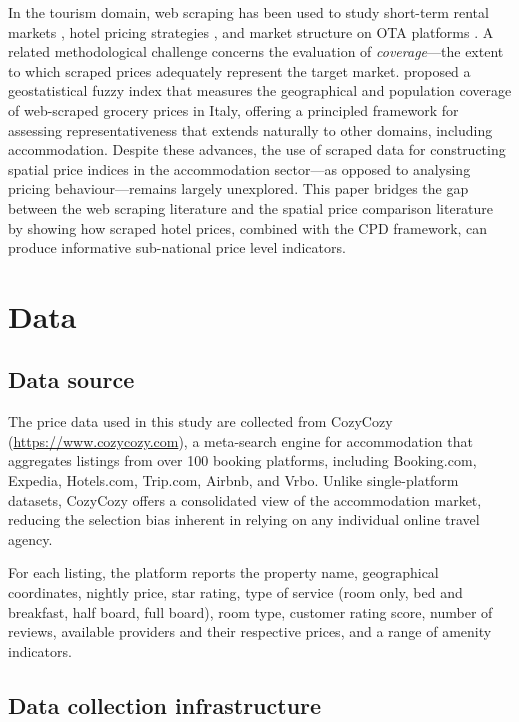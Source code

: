 \documentclass[12pt,a4paper]{article}
\begin{document}
In the tourism domain, web scraping has been used to study short-term rental markets \citep{gibbs2018pricing}, hotel pricing strategies \citep{abrate2012dynamic}, and market structure on OTA platforms \citep{hunold2018resale}. A related methodological challenge concerns the evaluation of \textit{coverage}---the extent to which scraped prices adequately represent the target market. \citet{palumbo2023coverage} proposed a geostatistical fuzzy index that measures the geographical and population coverage of web-scraped grocery prices in Italy, offering a principled framework for assessing representativeness that extends naturally to other domains, including accommodation. Despite these advances, the use of scraped data for constructing spatial price indices in the accommodation sector---as opposed to analysing pricing behaviour---remains largely unexplored. This paper bridges the gap between the web scraping literature and the spatial price comparison literature by showing how scraped hotel prices, combined with the CPD framework, can produce informative sub-national price level indicators.

\section{Data}
\label{sec:data}

\subsection{Data source}

The price data used in this study are collected from CozyCozy (\url{https://www.cozycozy.com}), a meta-search engine for accommodation that aggregates listings from over 100 booking platforms, including Booking.com, Expedia, Hotels.com, Trip.com, Airbnb, and Vrbo. Unlike single-platform datasets, CozyCozy offers a consolidated view of the accommodation market, reducing the selection bias inherent in relying on any individual online travel agency.

For each listing, the platform reports the property name, geographical coordinates, nightly price, star rating, type of service (room only, bed and breakfast, half board, full board), room type, customer rating score, number of reviews, available providers and their respective prices, and a range of amenity indicators.

\subsection{Data collection infrastructure}
\end{document}

